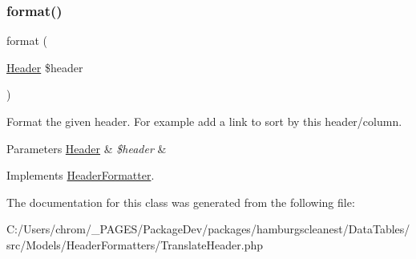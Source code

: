 \subsubsection{\texorpdfstring{format()}{format()}}
{\footnotesize\ttfamily format (\begin{DoxyParamCaption}\item[{\hyperlink{classhamburgscleanest_1_1_data_tables_1_1_models_1_1_header}{Header}}]{\$header }\end{DoxyParamCaption})}

Format the given header. For example add a link to sort by this header/column.


\begin{DoxyParams}[1]{Parameters}
\hyperlink{classhamburgscleanest_1_1_data_tables_1_1_models_1_1_header}{Header} & {\em \$header} & \\
\hline
\end{DoxyParams}


Implements \hyperlink{interfacehamburgscleanest_1_1_data_tables_1_1_interfaces_1_1_header_formatter_aa5aeddf9c056d9583b29322f75f70f82}{Header\+Formatter}.



The documentation for this class was generated from the following file\+:\begin{DoxyCompactItemize}
\item 
C\+:/\+Users/chrom/\+\_\+\+P\+A\+G\+E\+S/\+Package\+Dev/packages/hamburgscleanest/\+Data\+Tables/src/\+Models/\+Header\+Formatters/Translate\+Header.\+php\end{DoxyCompactItemize}
